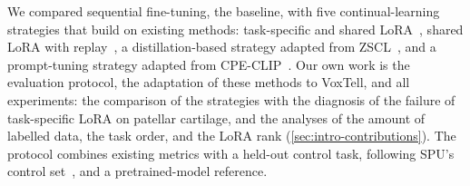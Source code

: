We compared sequential fine-tuning, the baseline, with five continual-learning strategies that build on existing methods: task-specific and shared LoRA~\cite{hu2022lora}, shared LoRA with replay~\cite[Sec.~3.1]{delange2022}, a distillation-based strategy adapted from ZSCL~\cite{zheng2023preventingzeroshottransferdegradation}, and a prompt-tuning strategy adapted from CPE-CLIP~\cite{D_Alessandro_2023}.
Our own work is the evaluation protocol, the adaptation of these methods to VoxTell, and all experiments: the comparison of the strategies with the diagnosis of the failure of task-specific LoRA on patellar cartilage, and the analyses of the amount of labelled data, the task order, and the LoRA rank (\cref{sec:intro-contributions}).
The protocol combines existing metrics with a held-out control task, following SPU's control set~\cite{Zhang_2024_CVPR}, and a pretrained-model reference.

